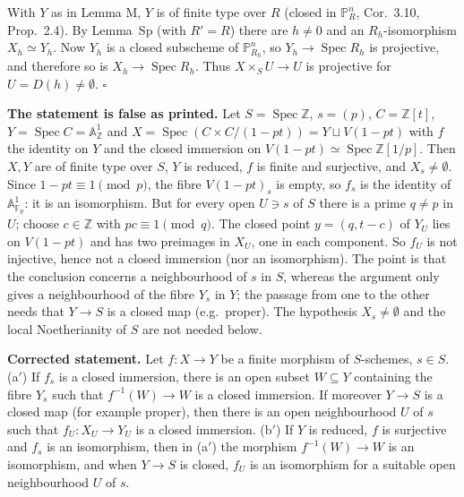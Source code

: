 \documentclass[11pt]{article}
\begin{document}
With $Y$ as in Lemma M, $Y$ is of finite type over $R$ (closed in $\mathbb{P}^n_R$, Cor.~3.10, Prop.~2.4). By Lemma~Sp (with $R'=R$) there are $h\neq0$ and an $R_h$-isomorphism $X_h\simeq Y_h$. Now $Y_h$ is a closed subscheme of $\mathbb{P}^n_{R_h}$, so $Y_h\to\operatorname{Spec}R_h$ is projective, and therefore so is $X_h\to\operatorname{Spec}R_h$. Thus $X\times_SU\to U$ is projective for $U=D(h)\neq\emptyset$. \hfill$\square$

\pf
\textbf{The statement is false as printed.} Let $S=\operatorname{Spec}\mathbb{Z}$, $s=(p)$, $C=\mathbb{Z}[t]$, $Y=\operatorname{Spec}C=\mathbb{A}^1_{\mathbb{Z}}$ and $X=\operatorname{Spec}(C\times C/(1-pt))=Y\sqcup V(1-pt)$ with $f$ the identity on $Y$ and the closed immersion on $V(1-pt)\simeq\operatorname{Spec}\mathbb{Z}[1/p]$. Then $X,Y$ are of finite type over $S$, $Y$ is reduced, $f$ is finite and surjective, and $X_s\neq\emptyset$. Since $1-pt\equiv1\pmod p$, the fibre $V(1-pt)_s$ is empty, so $f_s$ is the identity of $\mathbb{A}^1_{\mathbb{F}_p}$: it is an isomorphism. But for every open $U\ni s$ of $S$ there is a prime $q\neq p$ in $U$; choose $c\in\mathbb{Z}$ with $pc\equiv1\pmod q$. The closed point $y=(q,t-c)$ of $Y_U$ lies on $V(1-pt)$ and has two preimages in $X_U$, one in each component. So $f_U$ is not injective, hence not a closed immersion (nor an isomorphism). The point is that the conclusion concerns a neighbourhood of $s$ in $S$, whereas the argument only gives a neighbourhood of the fibre $Y_s$ in $Y$; the passage from one to the other needs that $Y\to S$ is a closed map (e.g.\ proper). The hypothesis $X_s\neq\emptyset$ and the local Noetherianity of $S$ are not needed below.

\textbf{Corrected statement.} Let $f:X\to Y$ be a finite morphism of $S$-schemes, $s\in S$.
(a$'$) If $f_s$ is a closed immersion, there is an open subset $W\subseteq Y$ containing the fibre $Y_s$ such that $f^{-1}(W)\to W$ is a closed immersion. If moreover $Y\to S$ is a closed map (for example proper), then there is an open neighbourhood $U$ of $s$ such that $f_U:X_U\to Y_U$ is a closed immersion.
(b$'$) If $Y$ is reduced, $f$ is surjective and $f_s$ is an isomorphism, then in (a$'$) the morphism $f^{-1}(W)\to W$ is an isomorphism, and when $Y\to S$ is closed, $f_U$ is an isomorphism for a suitable open neighbourhood $U$ of $s$.
\end{document}
